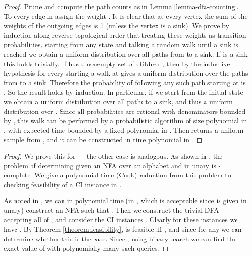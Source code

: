 \documentclass[a4paper,USenglish,numberwithinsect]{lipics}
\theoremstyle{plain}
\theoremstyle{definition}
\begin{document}
\lemmaDFAUnifSamp*
\begin{proof}
Prune  and compute the path counts  as in Lemma \ref{lemma-dfa-counting}. To every edge  in  assign the weight . It is clear that at every vertex the sum of the weights of the outgoing edges is 1 (unless the vertex is a sink). We prove by induction along reverse topological order that treating these weights as transition probabilities, starting from any state  and talking a random walk until a sink is reached we obtain a uniform distribution over all paths from  to a sink. If  is a sink this holds trivially. If  has a nonempty set of children , then by the inductive hypothesis for every  starting a walk at  gives a uniform distribution over the  paths from  to a sink. Therefore the probability of following any such path starting at  is . So the result holds by induction. In particular, if we start from the initial state we obtain a uniform distribution over all paths to a sink, and thus a uniform distribution over . Since all probabilities are rational with denominators bounded by , this walk can be performed by a probabilistic algorithm  of size polynomial in , with expected time bounded by a fixed polynomial in . Then  returns a uniform sample from , and it can be constructed in time polynomial in .
\end{proof}

\theoremNFAHardness*
\begin{proof}
We prove this for  --- the other case is analogous. As shown in \cite{sharpNFA}, the problem of determining  given an NFA  over an alphabet  and  in unary is -complete. We give a polynomial-time (Cook) reduction from this problem to checking feasibility of a CI instance in .

As noted in \cite{sharpNFA}, we can in polynomial time (in , which is acceptable since  is given in unary) construct an NFA  such that . Then we construct the trivial DFA  accepting all of , and consider the CI instances . Clearly for these instances we have . By Theorem \ref{theorem:feasibility},  is feasible iff , and since  for any  we can determine whether this is the case. Since , using binary search we can find the exact value of  with polynomially-many such queries.
\end{proof}
\end{document}
